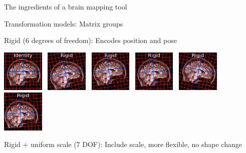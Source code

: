 \documentclass{beamer}
\begin{document}
\begin{frame}{The ingredients of a brain mapping tool}
\end{frame}


\begin{frame}{Transformation models: Matrix groups}

Rigid (6 degrees of freedom): Encodes position and pose

\includegraphics[width=0.15\textwidth]{tform_models_id}~
\includegraphics[width=0.15\textwidth]{tform_models_rigid_1}~
\includegraphics[width=0.15\textwidth]{tform_models_rigid_2}~
\includegraphics[width=0.15\textwidth]{tform_models_rigid_3}~
\includegraphics[width=0.15\textwidth]{tform_models_rigid_4}~
\includegraphics[width=0.15\textwidth]{tform_models_rigid_5}




Rigid + uniform scale (7 DOF): Include scale, more flexible, no shape change



\end{frame}
\end{document}
